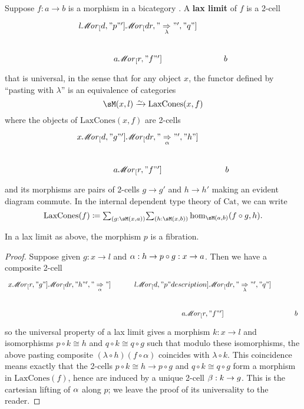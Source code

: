 \documentclass{amsart}
\let\To\Rightarrow
\def\ar#1{\mathscr{M}\!\mathit{or}_{#1}}
\begin{document}
\begin{defn}
  Suppose $f:a\to b$ is a morphism in a bicategory \sM.
  A \textbf{lax limit} of $f$ is a 2-cell
  \[
  \begin{tikzcd}
    l \ar[d,"p"'] \ar[dr,"\underset{\lambda}{\To}"',"q"] \\ a \ar[r,"f"'] & b
  \end{tikzcd}
  \]
  that is universal, in the sense that for any object $x$, the functor defined by ``pasting with $\lambda$'' is an equivalence of categories
  \[ \sM(x,l) \toiso \mathrm{LaxCones}(x,f) \]
  where the objects of $\mathrm{LaxCones}(x,f)$ are 2-cells
  \[
  \begin{tikzcd}
    x \ar[d,"g"'] \ar[dr,"\underset{\al}{\To}"',"h"] \\ a \ar[r,"f"'] & b
  \end{tikzcd}
  \]
  and its morphisms are pairs of 2-cells $g\to g'$ and $h\to h'$ making an evident diagram commute.
  In the internal dependent type theory of $\mathrm{Cat}$, we can write
  \[\mathrm{LaxCones}(f)\coloneqq
  \tsm{g:\sM(x,a)}{h:\sM(x,b)} \hom_{\sM(a,b)}(f\circ g,h).
  \]
\end{defn}

\begin{lem}
  In a lax limit as above, the morphism $p$ is a fibration.
\end{lem}
\begin{proof}
  Suppose given $g:x\to l$ and $\alpha:h\to p\circ g : x\to a$.
  Then we have a composite 2-cell
  \[
  \begin{tikzcd}
    x \ar[r,"g"] \ar[dr,"h"',"\underset{\al}{\To}"] &
    l \ar[d,"p" description] \ar[dr,"\underset{\lambda}{\To}"',"q"] \\
    & a \ar[r,"f"'] & b
  \end{tikzcd}
  \]
  so the universal property of a lax limit gives a morphism $k:x\to l$ and isomorphisms $p\circ k \cong h$ and $q\circ k\cong q\circ g$ such that modulo these isomorphisms, the above pasting composite $(\lambda\circ h)(f\circ \alpha)$ coincides with $\lambda\circ k$.
  This coincidence means exactly that the 2-cells $p\circ k \cong h \to p\circ g$ and $q\circ k \cong q\circ g$ form a morphism in $\mathrm{LaxCones}(f)$, hence are induced by a unique 2-cell $\beta:k\to g$.
  This is the cartesian lifting of $\alpha$ along $p$; we leave the proof of its universality to the reader.
\end{proof}
\end{document}
